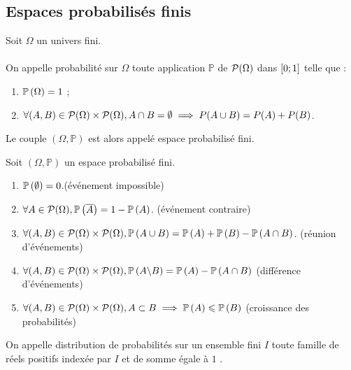 \subsection{Espaces probabilisés finis}
\begin{defi}
    Soit \(\Omega\) un univers fini.\\~\\
    On appelle probabilité sur \(\Omega\) toute application \(\mathbb{P}\) de \(\cal{P}(\Omega)\) dans \(\intervii{0}{1}\) telle que :
    \begin{enumerate}
        \item \(\proba{\Omega} = 1\) ;
        \item \(\forall (A, B) \in \cal{P} (\Omega) \times \cal{P} (\Omega), A \inter B = \emptyset \imp P(A \union B) = P(A) + P(B)\).
    \end{enumerate}
    Le couple \((\Omega, \mathbb{P})\) est alors appelé espace probabilisé fini.
\end{defi}
\begin{prop}
    Soit \((\Omega, \mathbb{P})\) un espace probabilisé fini.
    \begin{enumerate}
        \item \(\proba{\emptyset} = 0\).\hfill (événement impossible)
        \item \(\forall A \in \cal{P}(\Omega), \proba{\conj{A}} = 1 - \proba{A}\). \hfill (événement contraire)
        \item \(\forall(A, B) \in \cal{P}(\Omega) \times \cal{P}(\Omega), \proba{A \union B} = \proba{A} + \proba{B} - \proba{A \inter B}\). \hfill(réunion d’événements)
        \item \(\forall(A, B) \in \cal{P}(\Omega) \times \cal{P}(\Omega), \proba{A \pd B} = \proba{A} - \proba{A \inter B}\) \hfill (différence d’événements)
        \item \(\forall(A, B) \in \cal{P}(\Omega) \times \cal{P}(\Omega), A \subset B \imp \proba{A} \leq \proba{B}\) \hfill (croissance des probabilités)
    \end{enumerate}
\end{prop}
\begin{defprop}
    On appelle distribution de probabilités sur un ensemble fini \(I\) toute famille de réels positifs indexée par \(I\) et de somme égale à \(1\) .
\end{defprop}
